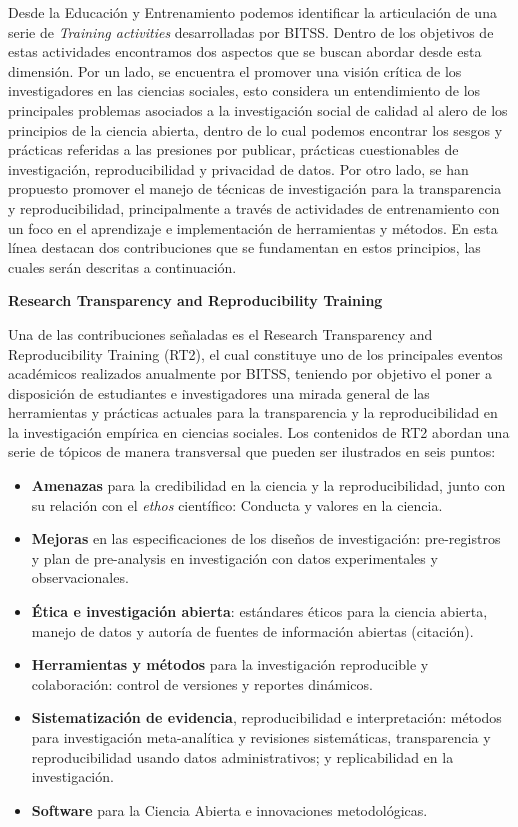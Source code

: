 \documentclass[
  spanish,
  a4paper,
  oneside]{scrbook}
\begin{document}
Desde la Educación y Entrenamiento podemos identificar la articulación
de una serie de \emph{Training activities} desarrolladas por BITSS.
Dentro de los objetivos de estas actividades encontramos dos aspectos
que se buscan abordar desde esta dimensión. Por un lado, se encuentra el
promover una visión crítica de los investigadores en las ciencias
sociales, esto considera un entendimiento de los principales problemas
asociados a la investigación social de calidad al alero de los
principios de la ciencia abierta, dentro de lo cual podemos encontrar
los sesgos y prácticas referidas a las presiones por publicar, prácticas
cuestionables de investigación, reproducibilidad y privacidad de datos.
Por otro lado, se han propuesto promover el manejo de técnicas de
investigación para la transparencia y reproducibilidad, principalmente a
través de actividades de entrenamiento con un foco en el aprendizaje e
implementación de herramientas y métodos. En esta línea destacan dos
contribuciones que se fundamentan en estos principios, las cuales serán
descritas a continuación.

\textbf{Research Transparency and Reproducibility Training}

Una de las contribuciones señaladas es el Research Transparency and
Reproducibility Training (RT2), el cual constituye uno de los
principales eventos académicos realizados anualmente por BITSS, teniendo
por objetivo el poner a disposición de estudiantes e investigadores una
mirada general de las herramientas y prácticas actuales para la
transparencia y la reproducibilidad en la investigación empírica en
ciencias sociales. Los contenidos de RT2 abordan una serie de tópicos de
manera transversal que pueden ser ilustrados en seis puntos:

\begin{itemize}
\item
  \textbf{Amenazas} para la credibilidad en la ciencia y la
  reproducibilidad, junto con su relación con el \emph{ethos}
  científico: Conducta y valores en la ciencia.
\item
  \textbf{Mejoras} en las especificaciones de los diseños de
  investigación: pre-registros y plan de pre-analysis en investigación
  con datos experimentales y observacionales.
\item
  \textbf{Ética e investigación abierta}: estándares éticos para la
  ciencia abierta, manejo de datos y autoría de fuentes de información
  abiertas (citación).
\item
  \textbf{Herramientas y métodos} para la investigación reproducible y
  colaboración: control de versiones y reportes dinámicos.
\item
  \textbf{Sistematización de evidencia}, reproducibilidad e
  interpretación: métodos para investigación meta-analítica y revisiones
  sistemáticas, transparencia y reproducibilidad usando datos
  administrativos; y replicabilidad en la investigación.
\item
  \textbf{Software} para la Ciencia Abierta e innovaciones
  metodológicas.
\end{itemize}
\end{document}
